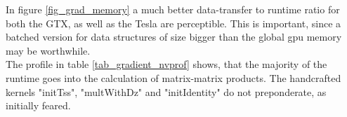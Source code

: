 In figure \ref{fig_grad_memory} a much better data-transfer to runtime ratio for both the GTX, as well as the Tesla are perceptible. This is important, since a batched version for data structures of size bigger than the global gpu memory may be worthwhile. \\

The profile in table  \ref{tab_gradient_nvprof} shows, that the majority of the runtime goes into the calculation of matrix-matrix products. The handcrafted kernels "initTss", "multWithDz" and "initIdentity" do not preponderate, as initially feared.